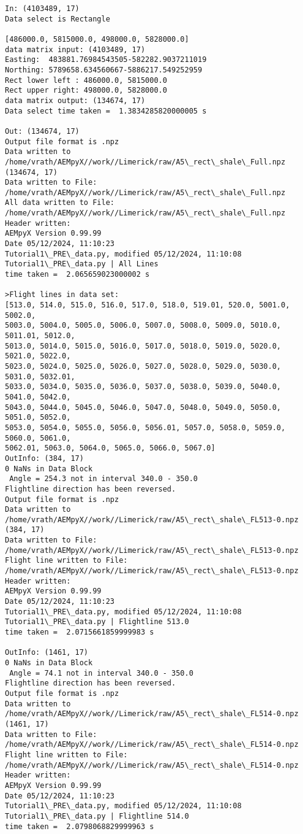 \documentclass[11pt]{article}
\begin{document}
    \begin{Verbatim}[commandchars=\\\{\}]
In: (4103489, 17)
Data select is Rectangle

[486000.0, 5815000.0, 498000.0, 5828000.0]
data matrix input: (4103489, 17)
Easting:  483881.76984543505-582282.9037211019
Northing: 5789658.634560667-5886217.549252959
Rect lower left : 486000.0, 5815000.0
Rect upper right: 498000.0, 5828000.0
data matrix output: (134674, 17)
Data select time taken =  1.3834285820000005 s

Out: (134674, 17)
Output file format is .npz
Data written to /home/vrath/AEMpyX//work//Limerick/raw/A5\_rect\_shale\_Full.npz
(134674, 17)
Data written to File:
/home/vrath/AEMpyX//work//Limerick/raw/A5\_rect\_shale\_Full.npz
All data written to File:
/home/vrath/AEMpyX//work//Limerick/raw/A5\_rect\_shale\_Full.npz
Header written:
AEMpyX Version 0.99.99
Date 05/12/2024, 11:10:23
Tutorial1\_PRE\_data.py, modified 05/12/2024, 11:10:08
Tutorial1\_PRE\_data.py | All Lines
time taken =  2.065659023000002 s

>Flight lines in data set:
[513.0, 514.0, 515.0, 516.0, 517.0, 518.0, 519.01, 520.0, 5001.0, 5002.0,
5003.0, 5004.0, 5005.0, 5006.0, 5007.0, 5008.0, 5009.0, 5010.0, 5011.01, 5012.0,
5013.0, 5014.0, 5015.0, 5016.0, 5017.0, 5018.0, 5019.0, 5020.0, 5021.0, 5022.0,
5023.0, 5024.0, 5025.0, 5026.0, 5027.0, 5028.0, 5029.0, 5030.0, 5031.0, 5032.01,
5033.0, 5034.0, 5035.0, 5036.0, 5037.0, 5038.0, 5039.0, 5040.0, 5041.0, 5042.0,
5043.0, 5044.0, 5045.0, 5046.0, 5047.0, 5048.0, 5049.0, 5050.0, 5051.0, 5052.0,
5053.0, 5054.0, 5055.0, 5056.0, 5056.01, 5057.0, 5058.0, 5059.0, 5060.0, 5061.0,
5062.01, 5063.0, 5064.0, 5065.0, 5066.0, 5067.0]
OutInfo: (384, 17)
0 NaNs in Data Block
 Angle = 254.3 not in interval 340.0 - 350.0
Flightline direction has been reversed.
Output file format is .npz
Data written to /home/vrath/AEMpyX//work//Limerick/raw/A5\_rect\_shale\_FL513-0.npz
(384, 17)
Data written to File:
/home/vrath/AEMpyX//work//Limerick/raw/A5\_rect\_shale\_FL513-0.npz
Flight line written to File:
/home/vrath/AEMpyX//work//Limerick/raw/A5\_rect\_shale\_FL513-0.npz
Header written:
AEMpyX Version 0.99.99
Date 05/12/2024, 11:10:23
Tutorial1\_PRE\_data.py, modified 05/12/2024, 11:10:08
Tutorial1\_PRE\_data.py | Flightline 513.0
time taken =  2.0715661859999983 s

OutInfo: (1461, 17)
0 NaNs in Data Block
 Angle = 74.1 not in interval 340.0 - 350.0
Flightline direction has been reversed.
Output file format is .npz
Data written to /home/vrath/AEMpyX//work//Limerick/raw/A5\_rect\_shale\_FL514-0.npz
(1461, 17)
Data written to File:
/home/vrath/AEMpyX//work//Limerick/raw/A5\_rect\_shale\_FL514-0.npz
Flight line written to File:
/home/vrath/AEMpyX//work//Limerick/raw/A5\_rect\_shale\_FL514-0.npz
Header written:
AEMpyX Version 0.99.99
Date 05/12/2024, 11:10:23
Tutorial1\_PRE\_data.py, modified 05/12/2024, 11:10:08
Tutorial1\_PRE\_data.py | Flightline 514.0
time taken =  2.0798068829999963 s


\end{Verbatim}
\end{document}
